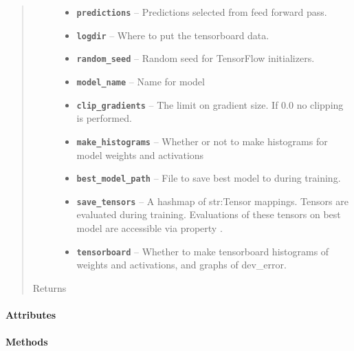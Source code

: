\documentclass[letterpaper,10pt,english]{sphinxmanual}
\begin{document}
\begin{fulllineitems}
\begin{quote}
\begin{description}
\begin{itemize}
\item {} 
\textbf{\texttt{predictions}} -- Predictions selected from feed forward pass.

\item {} 
\textbf{\texttt{logdir}} -- Where to put the tensorboard data.

\item {} 
\textbf{\texttt{random\_seed}} -- Random seed for TensorFlow initializers.

\item {} 
\textbf{\texttt{model\_name}} -- Name for model

\item {} 
\textbf{\texttt{clip\_gradients}} -- The limit on gradient size. If 0.0 no clipping is performed.

\item {} 
\textbf{\texttt{make\_histograms}} -- Whether or not to make histograms for model weights and activations

\item {} 
\textbf{\texttt{best\_model\_path}} -- File to save best model to during training.

\item {} 
\textbf{\texttt{save\_tensors}} -- A hashmap of str:Tensor mappings. Tensors are evaluated during training. Evaluations of these tensors on best model are accessible via property {\hyperref[generic_model:generic_model.Model.evaluated_tensors]{\emph{}}}.

\item {} 
\textbf{\texttt{tensorboard}} -- Whether to make tensorboard histograms of weights and activations, and graphs of dev\_error.

\end{itemize}

\item[{Returns}] \leavevmode
{\hyperref[generic_model:generic_model.Model]{\emph{}}}

\end{description}\end{quote}
\paragraph{Attributes}
\paragraph{Methods}


\end{fulllineitems}
\end{document}
